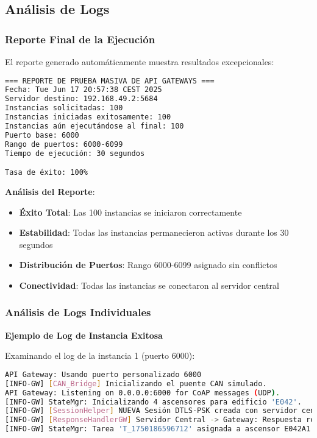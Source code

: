 \subsection{Análisis de Logs}\label{subsec:analisis-logs}

\subsubsection{Reporte Final de la Ejecución}

El reporte generado automáticamente muestra resultados excepcionales:

\begin{lstlisting}[language=bash,caption={Reporte Final - 17 de Junio 2025},label={lst:reporte-final}]
=== REPORTE DE PRUEBA MASIVA DE API GATEWAYS ===
Fecha: Tue Jun 17 20:57:38 CEST 2025
Servidor destino: 192.168.49.2:5684
Instancias solicitadas: 100
Instancias iniciadas exitosamente: 100
Instancias aún ejecutándose al final: 100
Puerto base: 6000
Rango de puertos: 6000-6099
Tiempo de ejecución: 30 segundos

Tasa de éxito: 100%
\end{lstlisting}

\textbf{Análisis del Reporte}:
\begin{itemize}
    \item \textcolor{successgreen}{\textbf{Éxito Total}}: Las 100 instancias se iniciaron correctamente
    \item \textcolor{successgreen}{\textbf{Estabilidad}}: Todas las instancias permanecieron activas durante los 30 segundos
    \item \textcolor{successgreen}{\textbf{Distribución de Puertos}}: Rango 6000-6099 asignado sin conflictos
    \item \textcolor{successgreen}{\textbf{Conectividad}}: Todas las instancias se conectaron al servidor central
\end{itemize}

\subsubsection{Análisis de Logs Individuales}

\textbf{Ejemplo de Log de Instancia Exitosa}

Examinando el log de la instancia 1 (puerto 6000):

\begin{lstlisting}[language=bash,caption={Log de Gateway 1 - Puerto 6000 (Extracto)},label={lst:log-gateway1}]
API Gateway: Usando puerto personalizado 6000
[INFO-GW] [CAN_Bridge] Inicializando el puente CAN simulado.
API Gateway: Listening on 0.0.0.0:6000 for CoAP messages (UDP).
[INFO-GW] StateMgr: Inicializando 4 ascensores para edificio 'E042'.
[INFO-GW] [SessionHelper] NUEVA Sesión DTLS-PSK creada con servidor central.
[INFO-GW] [ResponseHandlerGW] Servidor Central -> Gateway: Respuesta recibida.
[INFO-GW] StateMgr: Tarea 'T_1750186596712' asignada a ascensor E042A1.
\end{lstlisting}

